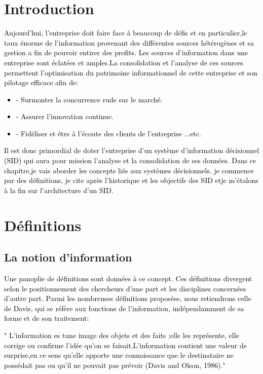 \documentclass[a4paper,12pt]{report}
\begin{document}
\section*{Introduction}
\textcolor{black}{Aujourd’hui, l’entreprise doit faire face à beaucoup de défis et en particulier,le taux énorme de l’information provenant des différentes sources hétérogènes et sa gestion a fin de pouvoir entirer des profits.
\textcolor{black}{Les sources d’information dans une entreprise sont éclatées et amples.La consolidation 
et l’analyse de ces sources permettent l’optimisation du patrimoine informationnel de cette entreprise et son pilotage efficace afin de:}
\begin{itemize}
	\item - Surmonter la concurrence rude sur le marché.
	\item - Assurer l’innovation continue.
	\item - Fidéliser et être à l’écoute des clients de l’entreprise ...etc.
\end{itemize}
\textcolor{black}{Il est donc primordial de doter l’entreprise d’un système d’information décisionnel (SID) qui aura pour mission l’analyse et la consolidation de ses données.
Dans ce chapitre,je vais aborder les concepts liés aux systèmes décisionnels. je commence par des définitions, je cite après l’historique et les objectifs des SID etje m'étalons à la fin sur l’architecture d’un SID.}}

\section{Définitions}
\subsection{La notion d’information}
\textcolor{black}{Une panoplie de définitions sont données à ce concept. Ces définitions divergent selon le positionnement des chercheurs d’une part et les disciplines concernées d’autre part.}
\textcolor{black}{Parmi les nombreuses définitions proposées, nous retiendrons celle de Davis, qui se réfère aux fonctions de l’information, indépendamment de sa forme et de son traitement:}

\textcolor{black}{ " L’information es tune image des objets et des faits ;elle les représente, elle corrige ou confirme l’idée qu’on se faisait.L’information contient une valeur de surprise,en ce sens
qu’elle apporte une connaissance que le destinataire ne possédait pas ou qu’il ne pouvait pas prévoir (Davis and Olson, 1986)."}
\end{document}
